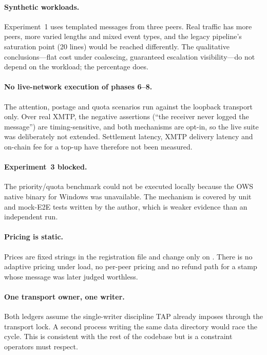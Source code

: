\paragraph{Synthetic workloads.}
Experiment~1 uses templated messages from three peers. Real traffic has more peers, more
varied lengths and mixed event types, and the legacy pipeline's saturation point (20
lines) would be reached differently. The qualitative conclusions---flat cost under
coalescing, guaranteed escalation visibility---do not depend on the workload; the
percentage does.

\paragraph{No live-network execution of phases 6--8.}
The attention, postage and quota scenarios run against the loopback transport only.
Over real XMTP, the negative assertions (``the receiver never logged the message'') are
timing-sensitive, and both mechanisms are opt-in, so the live suite was deliberately not
extended. Settlement latency, XMTP delivery latency and on-chain fee for a top-up have
therefore not been measured.

\paragraph{Experiment~3 blocked.}
The priority/quota benchmark could not be executed locally because the OWS native binary
for Windows was unavailable. The mechanism is covered by unit and mock-E2E tests written by
the author, which is weaker evidence than an independent run.

\paragraph{Pricing is static.}
Prices are fixed strings in the registration file and change only on
. There is no adaptive pricing under load, no per-peer pricing
and no refund path for a stamp whose message was later judged worthless.

\paragraph{One transport owner, one writer.}
Both ledgers assume the single-writer discipline TAP already imposes through the
transport lock. A second process writing the same data directory would race the
 cycle. This is consistent with the rest of the codebase but is a
constraint operators must respect.

